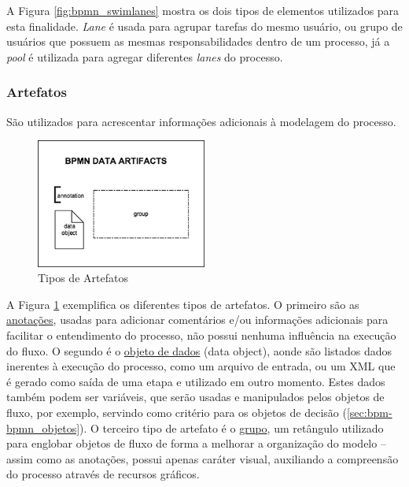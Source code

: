     A Figura \ref{fig:bpmn_swimlanes} mostra os dois tipos de elementos utilizados para esta finalidade. \textit{Lane} é usada para agrupar tarefas do mesmo usuário, ou grupo de usuários que possuem as mesmas responsabilidades dentro de um processo, já a \textit{pool} é utilizada para agregar diferentes \textit{lanes} do processo. 

\subsubsection{Artefatos}\label{sec:bpm-bpmn_objetos_artefatos}

    São utilizados para acrescentar informações adicionais à modelagem do processo. 

    \begin{figure}[H]
    \centering
    \includegraphics[width=0.5\textwidth]{imagens/bpmn_artifacts.png}
    \caption{Tipos de Artefatos\cite{tipos_artefatos}}
    \label{fig:bpmn_artifacts}
    \end{figure}
    
    A Figura \ref{fig:bpmn_artifacts} exemplifica os diferentes tipos de artefatos. O primeiro são as \underline{anotações}, usadas para adicionar comentários e/ou informações adicionais para facilitar o entendimento do processo, não possui nenhuma influência na execução do fluxo. O segundo é o \underline{objeto de dados} (data object), aonde são listados dados inerentes à execução do processo, como um arquivo de entrada, ou um XML\cite{xml} que é gerado como saída de uma etapa e utilizado em outro momento. Estes dados também podem ser variáveis, que serão usadas e manipulados pelos objetos de fluxo, por exemplo, servindo como critério para os objetos de decisão (\ref{sec:bpm-bpmn_objetos}). O terceiro tipo de artefato é o \underline{grupo}, um retângulo utilizado para englobar objetos de fluxo de forma a melhorar a organização do modelo -- assim como as anotações, possui apenas caráter visual, auxiliando a compreensão do processo através de recursos gráficos.


